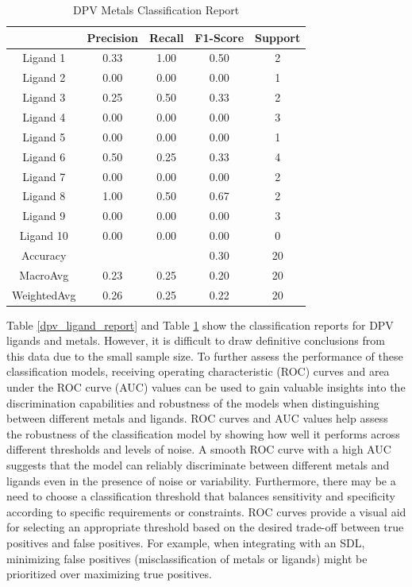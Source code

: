\begin{table}[!h]
\begin{center}
\begin{tabular}{c|c|c|c|c}
 & Precision & Recall & F1-Score & Support\\
\hline
Ligand 1 & 0.33 & 1.00 & 0.50 & 2\\
Ligand 2 & 0.00 & 0.00 & 0.00 & 1\\
Ligand 3 & 0.25 & 0.50 & 0.33 & 2\\
Ligand 4 & 0.00 & 0.00 & 0.00 & 3\\
Ligand 5 & 0.00 & 0.00 & 0.00 & 1\\
Ligand 6 & 0.50 & 0.25 & 0.33 & 4\\
Ligand 7 & 0.00 & 0.00 & 0.00 & 2\\
Ligand 8 & 1.00 & 0.50 & 0.67 & 2\\
Ligand 9 & 0.00 & 0.00 & 0.00 & 3\\
Ligand 10 & 0.00 & 0.00 & 0.00 & 0\\
\hline
Accuracy & & & 0.30 & 20\\
MacroAvg & 0.23 & 0.25 & 0.20 & 20\\
WeightedAvg & 0.26 & 0.25 & 0.22 & 20
\end{tabular}
\caption{DPV Metals Classification Report}
\label{dpv_metal_report}
\end{center}
\end{table}
Table \ref{dpv_ligand_report} and Table \ref{dpv_metal_report} show the classification reports for DPV ligands and metals. However, it is difficult to draw definitive conclusions from this data due to the small sample size. To further assess the performance of these classification models, receiving operating characteristic (ROC) curves and area under the ROC curve (AUC) values can be used to gain valuable insights into the discrimination capabilities and robustness of the models when distinguishing between different metals and ligands. ROC curves and AUC values help assess the robustness of the classification model by showing how well it performs across different thresholds and levels of noise. A smooth ROC curve with a high AUC suggests that the model can reliably discriminate between different metals and ligands even in the presence of noise or variability. Furthermore, there may be a need to choose a classification threshold that balances sensitivity and specificity according to specific requirements or constraints. ROC curves provide a visual aid for selecting an appropriate threshold based on the desired trade-off between true positives and false positives. For example, when integrating with an SDL, minimizing false positives (misclassification of metals or ligands) might be prioritized over maximizing true positives.
